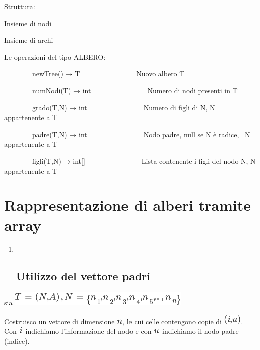 \documentclass{article}
\begin{document}
{}

{Struttura:}

{}

{Insieme di nodi}

{Insieme di archi}

{}

{Le operazioni del tipo ALBERO:}

{}

{~~~~~~~~newTree() → T~~~~~~~~~~~~~~~~Nuovo albero T}

{~~~~~~~~numNodi(T) → int~~~~~~~~~~~~~~~~Numero di nodi presenti in T}

{~~~~~~~~grado(T,N) → int~~~~~~~~~~~~~~~~Numero di figli di N, N
appartenente a T}

{~~~~~~~~padre(T,N) → int~~~~~~~~~~~~~~~~Nodo padre, null se N è radice,
~N appartenente a T}

{~~~~~~~~figli(T,N) → int{[}{]}~~~~~~~~~~~~~~~~Lista contenente i figli
del nodo N, N appartenente a T}

{}

\hypertarget{h.ueuovjwdu9zj}{\section{\texorpdfstring{{Rappresentazione
di alberi tramite
array}}{Rappresentazione di alberi tramite array}}\label{h.ueuovjwdu9zj}}

{}

\begin{enumerate}
\item ~
  \hypertarget{h.nrzs3ooed9o}{\subsection{\texorpdfstring{{Utilizzo del
  vettore padri}}{Utilizzo del vettore padri}}\label{h.nrzs3ooed9o}}
\end{enumerate}

{}

{}

{}

{}

{sia }\includegraphics{images/image100.png}

{Costruisco un vettore di dimensione
}\includegraphics{images/image41.png}{, le cui celle contengono copie di
}\includegraphics{images/image101.png}{. Con
}\includegraphics{images/image102.png}{~indichiamo l'informazione del
nodo e con }\includegraphics{images/image103.png}{~indichiamo il nodo
padre (indice).}
\end{document}
